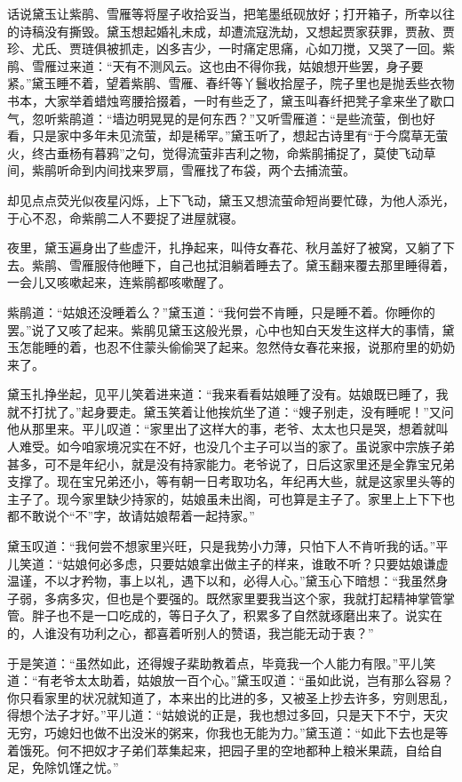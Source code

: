 \documentclass[12pt,oneside]{book}
\begin{document}
话说黛玉让紫鹃、雪雁等将屋子收拾妥当，把笔墨纸砚放好；打开箱子，所幸以往的诗稿没有撕毁。黛玉想起婚礼未成，却遭流寇洗劫，又想起贾家获罪，贾赦、贾珍、尤氏、贾琏俱被抓走，凶多吉少，一时痛定思痛，心如刀搅，又哭了一回。紫鹃、雪雁过来道：“天有不测风云。这也由不得你我，姑娘想开些罢，身子要紧。”黛玉睡不着，望着紫鹃、雪雁、春纤等丫鬟收拾屋子，院子里也是抛丢些衣物书本，大家举着蜡烛弯腰拾掇着，一时有些乏了，黛玉叫春纤把凳子拿来坐了歇口气，忽听紫鹃道：“墙边明晃晃的是何东西？”又听雪雁道：“是些流萤，倒也好看，只是家中多年未见流萤，却是稀罕。”黛玉听了，想起古诗里有“于今腐草无萤火，终古垂杨有暮鸦”之句，觉得流萤非吉利之物，命紫鹃捕捉了，莫使飞动草间，紫鹃听命到内间找来罗扇，雪雁找了布袋，两个去捕流萤。

却见点点荧光似夜星闪烁，上下飞动，黛玉又想流萤命短尚要忙碌，为他人添光，于心不忍，命紫鹃二人不要捉了进屋就寝。

夜里，黛玉遍身出了些虚汗，扎挣起来，叫侍女春花、秋月盖好了被窝，又躺了下去。紫鹃、雪雁服侍他睡下，自己也拭泪躺着睡去了。黛玉翻来覆去那里睡得着，一会儿又咳嗽起来，连紫鹃都咳嗽醒了。

紫鹃道：“姑娘还没睡着么？”黛玉道：“我何尝不肯睡，只是睡不着。你睡你的罢。”说了又咳了起来。紫鹃见黛玉这般光景，心中也知白天发生这样大的事情，黛玉怎能睡的着，也忍不住蒙头偷偷哭了起来。忽然侍女春花来报，说那府里的奶奶来了。

黛玉扎挣坐起，见平儿笑着进来道：“我来看看姑娘睡了没有。姑娘既已睡了，我就不打扰了。”起身要走。黛玉笑着让他挨炕坐了道：“嫂子别走，没有睡呢！”又问他从那里来。平儿叹道：“家里出了这样大的事，老爷、太太也只是哭，想着就叫人难受。如今咱家境况实在不好，也没几个主子可以当的家了。虽说家中宗族子弟甚多，可不是年纪小，就是没有持家能力。老爷说了，日后这家里还是全靠宝兄弟支撑了。现在宝兄弟还小，等有朝一日考取功名，年纪再大些，就是这家里头等的主子了。现今家里缺少持家的，姑娘虽未出阁，可也算是主子了。家里上上下下也都不敢说个“不”字，故请姑娘帮着一起持家。”

黛玉叹道：“我何尝不想家里兴旺，只是我势小力薄，只怕下人不肯听我的话。”平儿笑道：“姑娘何必多虑，只要姑娘拿出做主子的样来，谁敢不听？只要姑娘谦虚温谨，不以才矜物，事上以礼，遇下以和，必得人心。”黛玉心下暗想：“我虽然身子弱，多病多灾，但也是个要强的。既然家里要我当这个家，我就打起精神掌管掌管。胖子也不是一口吃成的，等日子久了，积累多了自然就琢磨出来了。说实在的，人谁没有功利之心，都喜着听别人的赞语，我岂能无动于衷？”

于是笑道：“虽然如此，还得嫂子棐助教着点，毕竟我一个人能力有限。”平儿笑道：“有老爷太太助着，姑娘放一百个心。”黛玉叹道：“虽如此说，岂有那么容易？你只看家里的状况就知道了，本来出的比进的多，又被圣上抄去许多，穷则思乱，得想个法子才好。”平儿道：“姑娘说的正是，我也想过多回，只是天下不宁，天灾无穷，巧媳妇也做不出没米的粥来，你我也无能为力。”黛玉道：“如此下去也是等着饿死。何不把奴才子弟们萃集起来，把园子里的空地都种上粮米果蔬，自给自足，免除饥馑之忧。”
\end{document}

